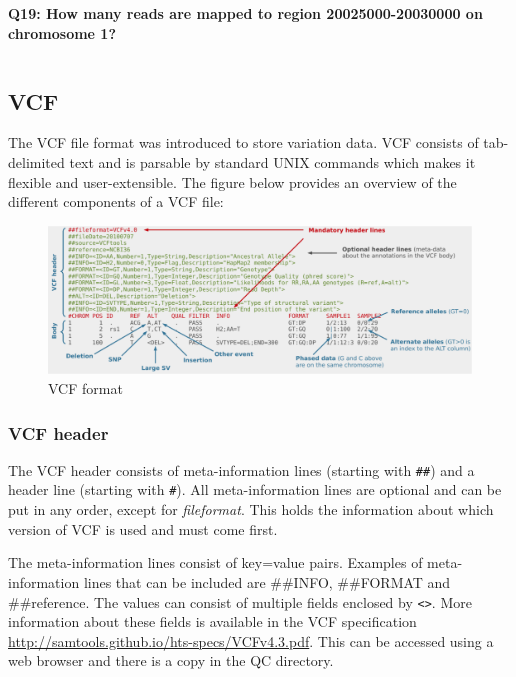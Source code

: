 \documentclass[11pt]{article}
\makeatletter
\newcommand{\boxspacing}{\kern\kvtcb@left@rule\kern\kvtcb@boxsep}
\newcommand{\prompt}[4]{
        {\ttfamily\llap{{\color{blue}\LARGE\faKeyboardO\hspace{3pt}#4}}\vspace{-\baselineskip}}
    }
\makeatother
\begin{document}
\textbf{Q19: How many reads are mapped to region 20025000-20030000 on
chromosome 1?}

    \begin{tcolorbox}[breakable, size=fbox, boxrule=1pt, pad at break*=1mm,colback=cellbackground, colframe=cellborder]
\prompt{In}{incolor}{ }{\boxspacing}
\begin{Verbatim}[commandchars=\\\{\}]

\end{Verbatim}
\end{tcolorbox}

    \hypertarget{vcf}{%
\subsection{VCF}\label{vcf}}

The VCF file format was introduced to store variation data. VCF consists
of tab-delimited text and is parsable by standard UNIX commands which
makes it flexible and user-extensible. The figure below provides an
overview of the different components of a VCF file:

    \begin{figure}[!h]
\centering
\includegraphics{img/VCF1.png}
\caption{VCF format}
\end{figure}

    \hypertarget{vcf-header}{%
\subsubsection{VCF header}\label{vcf-header}}

The VCF header consists of meta-information lines (starting with
\texttt{\#\#}) and a header line (starting with \texttt{\#}). All
meta-information lines are optional and can be put in any order, except
for \textit{fileformat}. This holds the information about which version of
VCF is used and must come first.

The meta-information lines consist of key=value pairs. Examples of
meta-information lines that can be included are \#\#INFO, \#\#FORMAT and
\#\#reference. The values can consist of multiple fields enclosed by
\texttt{\textless{}\textgreater{}}. More information about these fields
is available in the VCF specification
\url{http://samtools.github.io/hts-specs/VCFv4.3.pdf}. This can be
accessed using a web browser and there is a copy in the QC directory.
\end{document}
